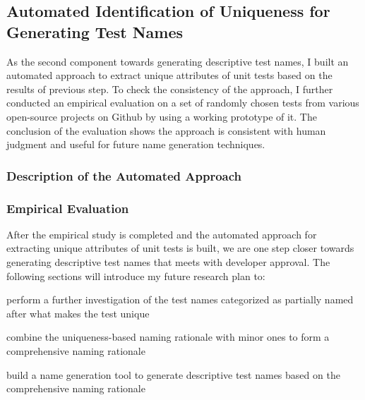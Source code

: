 \subsection{Automated Identification of Uniqueness for Generating Test Names}
\label{sec:uniquness-approach}

As the second component towards generating descriptive test names, I built an automated approach to extract unique attributes of unit tests based on the results of previous step.
%
To check the consistency of the approach, I further conducted an empirical evaluation on a set of randomly chosen tests from various open-source projects on Github by using a working prototype of it.
%
The conclusion of the evaluation shows the approach is consistent with human judgment and useful for future name generation techniques.


\subsubsection{Description of the Automated Approach}

\subsubsection{Empirical Evaluation}
\label{sec:emp-eval-attributes}


After the empirical study is completed and the automated approach for extracting unique attributes of unit tests is built, we are one step closer towards generating descriptive test names that meets with developer approval.
%
The following sections will introduce my future research plan to:
\begin{enumerate*}
    \item perform a further investigation of the test names categorized as partially named after what makes the test unique
    \item combine the uniqueness-based naming rationale with minor ones to form a comprehensive naming rationale
    \item build a name generation tool to generate descriptive test names based on the comprehensive naming rationale 
\end{enumerate*}

